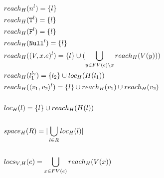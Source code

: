 \documentclass[11pt]{article}
\newcommand{\irl}[1]{\mathtt{#1}}
\begin{document}
\begin{align*}
  &reach_{H}(n^l) = \{l\}\\
  &reach_{H}(\irl{T}^l) = \{l\}\\
  &reach_{H}(\irl{F}^l) = \{l\}\\
  &reach_{H}(\irl{Null}^l) = \{l\}\\
  &reach_{H}((V, x.e)^l) = \{l\} \cup (\bigcup\limits_{y \in FV(e) \setminus x} reach_H(V(y))) \\
  &reach_{H}(l_1^{l_2}) = \{l_2\} \cup loc_{H}(H(l_1))\\
  &reach_{H}(\pairexcst{v_1}{v_2}^l) = \{l\} \cup reach_{H}(v_1) \cup reach_{H}(v_2)\\\\
  &loc_{H}(l) = \{l\} \cup reach_{H}(H(l))\\\\
  &space_{H}(R) = |\bigcup\limits_{l \in R} loc_{H}(l)|\\\\
  &locs_{V,H}(e) = \bigcup\limits_{x \in FV(e)} reach_H(V(x))
\end{align*}
\end{document}
